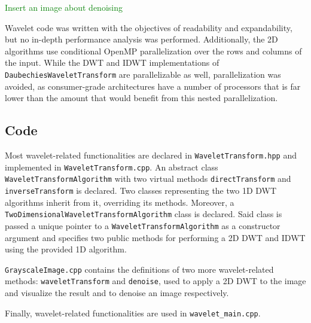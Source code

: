 \textcolor{green}{Insert an image about denoising}

Wavelet code was written with the objectives of readability and expandability, but no in-depth performance analysis was performed. Additionally, the 2D algorithms use conditional OpenMP parallelization over the rows and columns of the input. While the DWT and IDWT implementations of \texttt{Daubechies\-Wavelet\-Transform} are parallelizable as well, parallelization was avoided, as consumer-grade architectures have a number of processors that is far lower than the amount that would benefit from this nested parallelization.

\subsection{Code}
Most wavelet-related functionalities are declared in \texttt{Wavelet\-Transform.hpp} and implemented in \texttt{Wavelet\-Transform.cpp}. An abstract class \texttt{Wavelet\-Transform\-Algorithm} with two virtual methods \texttt{direct\-Transform} and \texttt{inverse\-Transform} is declared. Two classes representing the two 1D DWT algorithms inherit from it, overriding its methods. Moreover, a \texttt{Two\-Dimensional\-Wavelet\-Transform\-Algorithm} class is declared. Said class is passed a unique pointer to a \texttt{Wavelet\-Transform\-Algorithm} as a constructor argument and specifies two public methods for performing a 2D DWT and IDWT using the provided 1D algorithm.

\texttt{Grayscale\-Image.cpp} contains the definitions of two more wavelet-related methods: \texttt{wavelet\-Transform} and \texttt{denoise}, used to apply a 2D DWT to the image and visualize the result and to denoise an image respectively.

Finally, wavelet-related functionalities are used in \texttt{wavelet\_main.cpp}.